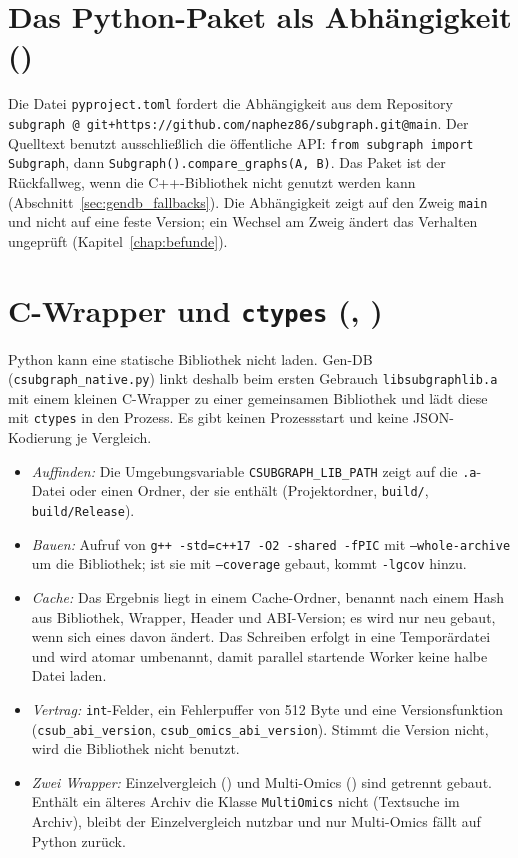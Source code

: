 \section{Das Python-Paket als Abhängigkeit ()}
\label{sec:gendb_python}

Die Datei \texttt{pyproject.toml} fordert die Abhängigkeit aus dem Repository \texttt{subgraph @ git+https://github.com/naphez86/subgraph.git@main}. Der Quelltext benutzt ausschließlich die öffentliche API: \texttt{from subgraph import Subgraph}, dann \texttt{Subgraph().compare\_graphs(A, B)}. Das Paket ist der Rückfallweg, wenn die C++-Bibliothek nicht genutzt werden kann (Abschnitt~\ref{sec:gendb_fallbacks}). Die Abhängigkeit zeigt auf den Zweig \texttt{main} und nicht auf eine feste Version; ein Wechsel am Zweig ändert das Verhalten ungeprüft (Kapitel~\ref{chap:befunde}).

\section{C-Wrapper und \texttt{ctypes} (, )}
\label{sec:gendb_wrapper}

Python kann eine statische Bibliothek nicht laden. Gen-DB (\texttt{csubgraph\_native.py}) linkt deshalb beim ersten Gebrauch \texttt{libsubgraphlib.a} mit einem kleinen C-Wrapper zu einer gemeinsamen Bibliothek und lädt diese mit \texttt{ctypes} in den Prozess. Es gibt keinen Prozessstart und keine JSON-Kodierung je Vergleich.

\begin{itemize}
	\item \emph{Auffinden:} Die Umgebungsvariable \texttt{CSUBGRAPH\_LIB\_PATH} zeigt auf die \texttt{.a}-Datei oder einen Ordner, der sie enthält (Projektordner, \texttt{build/}, \texttt{build/Release}).
	\item \emph{Bauen:} Aufruf von \texttt{g++ -std=c++17 -O2 -shared -fPIC} mit \texttt{--whole-archive} um die Bibliothek; ist sie mit \texttt{--coverage} gebaut, kommt \texttt{-lgcov} hinzu.
	\item \emph{Cache:} Das Ergebnis liegt in einem Cache-Ordner, benannt nach einem Hash aus Bibliothek, Wrapper, Header und ABI-Version; es wird nur neu gebaut, wenn sich eines davon ändert. Das Schreiben erfolgt in eine Temporärdatei und wird atomar umbenannt, damit parallel startende Worker keine halbe Datei laden.
	\item \emph{Vertrag:} \texttt{int}-Felder, ein Fehlerpuffer von 512 Byte und eine Versionsfunktion (\texttt{csub\_abi\_version}, \texttt{csub\_omics\_abi\_version}). Stimmt die Version nicht, wird die Bibliothek nicht benutzt.
	\item \emph{Zwei Wrapper:} Einzelvergleich () und Multi-Omics () sind getrennt gebaut. Enthält ein älteres Archiv die Klasse \texttt{MultiOmics} nicht (Textsuche im Archiv), bleibt der Einzelvergleich nutzbar und nur Multi-Omics fällt auf Python zurück.
\end{itemize}

